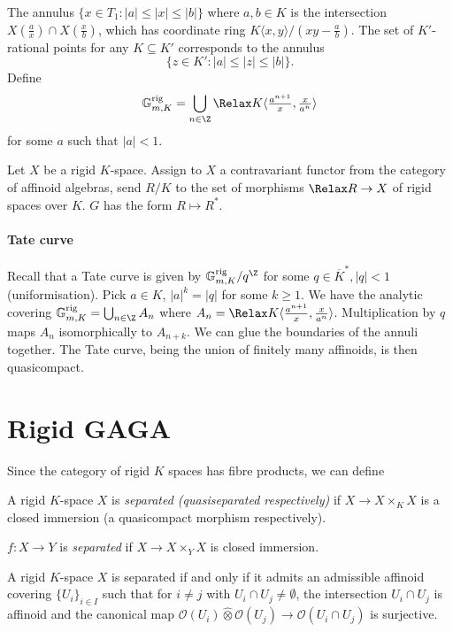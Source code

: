 \documentclass[a4paper]{article}
\newcommand{\sh}[1]{\mathcal{#1}} %
\let\Sp\Relax
\DeclareMathOperator{\Sp}{Sp} %
\begin{document}
The annulus \(\{x \in T_1: |a| \leq |x| \leq |b|\}\) where \(a, b \in K\) is the intersection \(X(\frac{a}{x}) \cap X(\frac{x}{b})\), which has coordinate ring \(K \langle x, y \rangle/(xy - \frac{a}{b})\). The set of \(K'\)-rational points for any \(K \subseteq K'\) corresponds to the annulus
\[
  \{z \in K': |a| \leq |z| \leq |b|\}.
\]
Define
\[
  \mathbb G_{m, K}^{\mathrm{rig}} = \bigcup_{n \in \Z} \Sp K \langle \tfrac{a^{n + 1}}{x}, \tfrac{x}{a^n} \rangle
\]
for some \(a\) such that \(|a| < 1\).

Let \(X\) be a rigid \(K\)-space. Assign to \(X\) a contravariant functor from the category of affinoid algebras, send \(R/K\) to the set of morphisms  \(\Sp R \to X\) of rigid spaces over \(K\). \(G\) has the form \(R \mapsto R^*\).

\paragraph{Tate curve}

Recall that a Tate curve is given by \(\mathbb G_{m, K}^{\mathrm{rig}}/q^\Z\) for some \(q \in \overline K^*, |q| < 1\) (uniformisation). Pick \(a \in K\), \(|a|^k = |q|\) for some \(k \geq 1\). We have the analytic covering \(\mathbb G_{m, K}^{\mathrm{rig}} = \bigcup_{n \in \Z} A_n\) where \(A_n = \Sp K \langle \tfrac{a^{n + 1}}{x}, \tfrac{x}{a^n} \rangle\). Multiplication by \(q\) maps \(A_n\) isomorphically to \(A_{n + k}\). We can glue the boundaries of the annuli together. The Tate curve, being the union of finitely many affinoids, is then quasicompact.

\section{Rigid GAGA}

Since the category of rigid \(K\) spaces has fibre products, we can define

\begin{definition}
  A rigid \(K\)-space \(X\) is \emph{separated (quasiseparated respectively)} if \(X \to X \times_K X\) is a closed immersion (a quasicompact morphism respectively).

  \(f: X \to Y\) is \emph{separated} if \(X \to X \times_Y X\) is closed immersion.
\end{definition}

\begin{proposition}
  A rigid \(K\)-space \(X\) is separated if and only if it admits an admissible affinoid covering \(\{U_i\}_{i \in I}\) such that for \(i \ne j\) with \(U_i \cap U_j \ne \emptyset\), the intersection \(U_i \cap U_j\) is affinoid and the canonical map \(\sh O(U_i) \hat \otimes \sh O(U_j) \to \sh O(U_i \cap U_j)\) is surjective.
\end{proposition}
\end{document}
